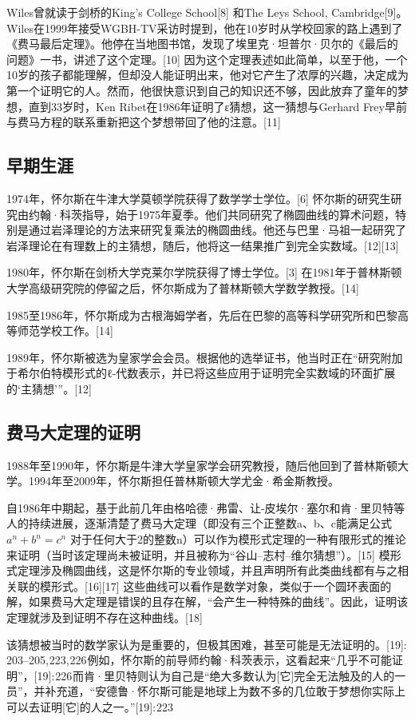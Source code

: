 Wiles曾就读于剑桥的King's College School[8] 和The Leys School, Cambridge[9]。Wiles在1999年接受WGBH-TV采访时提到，他在10岁时从学校回家的路上遇到了《费马最后定理》。他停在当地图书馆，发现了埃里克·坦普尔·贝尔的《最后的问题》一书，讲述了这个定理。[10] 因为这个定理表述如此简单，以至于他，一个10岁的孩子都能理解，但却没人能证明出来，他对它产生了浓厚的兴趣，决定成为第一个证明它的人。然而，他很快意识到自己的知识还不够，因此放弃了童年的梦想，直到33岁时，Ken Ribet在1986年证明了ε猜想，这一猜想与Gerhard Frey早前与费马方程的联系重新把这个梦想带回了他的注意。[11]
\subsection{早期生涯}
1974年，怀尔斯在牛津大学莫顿学院获得了数学学士学位。[6] 怀尔斯的研究生研究由约翰·科茨指导，始于1975年夏季。他们共同研究了椭圆曲线的算术问题，特别是通过岩泽理论的方法来研究复乘法的椭圆曲线。他还与巴里·马祖一起研究了岩泽理论在有理数上的主猜想，随后，他将这一结果推广到完全实数域。[12][13]

1980年，怀尔斯在剑桥大学克莱尔学院获得了博士学位。[3] 在1981年于普林斯顿大学高级研究院的停留之后，怀尔斯成为了普林斯顿大学数学教授。[14]

1985至1986年，怀尔斯成为古根海姆学者，先后在巴黎的高等科学研究所和巴黎高等师范学校工作。[14]

1989年，怀尔斯被选为皇家学会会员。根据他的选举证书，他当时正在“研究附加于希尔伯特模形式的ℓ-代数表示，并已将这些应用于证明完全实数域的环面扩展的‘主猜想’”。[12]
\subsection{费马大定理的证明}
1988年至1990年，怀尔斯是牛津大学皇家学会研究教授，随后他回到了普林斯顿大学。1994年至2009年，怀尔斯担任普林斯顿大学尤金·希金斯教授。

自1986年中期起，基于此前几年由格哈德·弗雷、让-皮埃尔·塞尔和肯·里贝特等人的持续进展，逐渐清楚了费马大定理（即没有三个正整数a、b、c能满足公式 \(a^n + b^n = c^n\) 对于任何大于2的整数n）可以作为模形式定理的一种有限形式的推论来证明（当时该定理尚未被证明，并且被称为“谷山–志村–维尔猜想”）。[15] 模形式定理涉及椭圆曲线，这是怀尔斯的专业领域，并且声明所有此类曲线都有与之相关联的模形式。[16][17] 这些曲线可以看作是数学对象，类似于一个圆环表面的解，如果费马大定理是错误的且存在解，“会产生一种特殊的曲线”。因此，证明该定理就涉及到证明不存在这种曲线。[18]

该猜想被当时的数学家认为是重要的，但极其困难，甚至可能是无法证明的。[19]: 203–205, 223, 226 例如，怀尔斯的前导师约翰·科茨表示，这看起来“几乎不可能证明”，[19]: 226 而肯·里贝特则认为自己是“绝大多数认为[它]完全无法触及的人的一员”，并补充道，“安德鲁·怀尔斯可能是地球上为数不多的几位敢于梦想你实际上可以去证明[它]的人之一。”[19]: 223 

